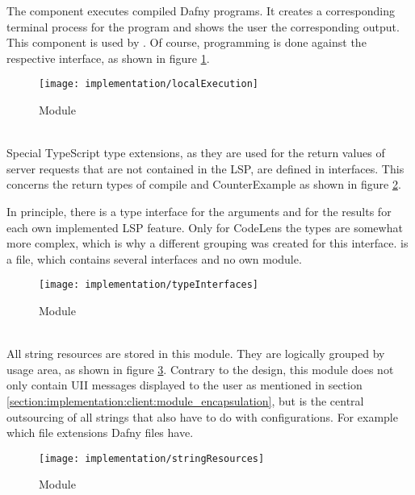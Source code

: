The component   executes compiled Dafny programs.
It creates a corresponding terminal process
for the program and shows the user the corresponding output.
This component is used by .
Of course, programming is done against the respective interface, as shown in figure \ref{fig:localExecution}.

\begin{figure}[H]
    \centering
    \texttt{[image: implementation/localExecution]}
    \caption{Module }
    \label{fig:localExecution}
\end{figure}

\textbf{}\\
Special TypeScript type extensions,
as they are used for the return values of server requests
that are not contained in the LSP, are defined in interfaces.
This concerns the return types of compile and CounterExample as shown in figure \ref{fig:typeInterfaces}.

In principle, there is a type interface for the arguments and for the results for each own implemented LSP feature.
Only for CodeLens the types are somewhat more complex, which is why a different grouping was created for this interface.
 is a file, which contains several interfaces and no own module.

\begin{figure}[H]
    \centering
    \texttt{[image: implementation/typeInterfaces]}
    \caption{Module }
    \label{fig:typeInterfaces}
\end{figure}

\textbf{}\\
All string resources are stored in this module.
They are logically grouped by usage area, as shown in figure \ref{fig:stringResources}.
Contrary to the design, this module does not only contain UII messages displayed to the user as mentioned in section
\ref{section:implementation:client:module_encapsulation},
but is the central outsourcing of all strings that also have to do with configurations.
For example which file extensions Dafny files have.

\begin{figure}[H]
    \centering
    \texttt{[image: implementation/stringResources]}
    \caption{Module }
    \label{fig:stringResources}
\end{figure}

